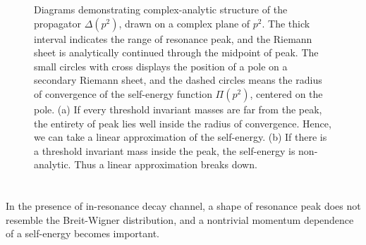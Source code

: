 \documentclass[11pt]{article}
\theoremstyle{definition}
\theoremstyle{remark}
\begin{document}
	\begin{figure}
		\centering
		\begin{subfigure}[b]{0.4\textwidth}
			\centering
			\caption{}
			\label{fig:pole_structure:out_peak}
		\end{subfigure}
		\begin{subfigure}[b]{0.3\textwidth}
			\centering
			\caption{}
			\label{fig:pole_structure:in_peak}
		\end{subfigure}
		\captionsetup{width=.9\linewidth}
		\caption{Diagrams demonstrating complex-analytic structure of the propagator $\Delta(p^{2})$, drawn on a complex plane of $p^{2}$. The thick interval indicates the range of resonance peak, and the Riemann sheet is analytically continued through the midpoint of peak. The small circles with cross displays the position of a pole on a secondary Riemann sheet, and the dashed circles means the radius of convergence of the self-energy function $\Pi(p^{2})$, centered on the pole. (a) If every threshold invariant masses are far from the peak, the entirety of peak lies well inside the radius of convergence. Hence, we can take a linear approximation of the self-energy. (b) If there is a threshold invariant mass inside the peak, the self-energy is non-analytic. Thus a linear approximation breaks down.}
		\label{fig:pole_structure}
	\end{figure}
	
	\section{}
	In the presence of in-resonance decay channel, a shape of resonance peak does not resemble the Breit-Wigner distribution, and a nontrivial momentum dependence of a self-energy becomes important.
	
\end{document}
